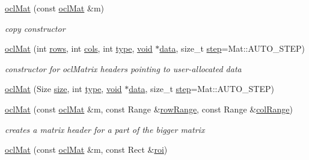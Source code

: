 \begin{DoxyCompactItemize}
\item 
\hyperlink{classcv_1_1ocl_1_1oclMat_a1b06b658bf4bcb8f9a41c969ded8af22}{ocl\-Mat} (const \hyperlink{classcv_1_1ocl_1_1oclMat}{ocl\-Mat} \&m)
\begin{DoxyCompactList}\small\item\em copy constructor \end{DoxyCompactList}\item 
\hyperlink{classcv_1_1ocl_1_1oclMat_a73947d6aaec7670cda8f91edf6c9111a}{ocl\-Mat} (int \hyperlink{classcv_1_1ocl_1_1oclMat_a1ccf0125fff51e419aa89b144ed511be}{rows}, int \hyperlink{classcv_1_1ocl_1_1oclMat_ac814acb1fd2613d43e5fbb9c2166ac9f}{cols}, int \hyperlink{classcv_1_1ocl_1_1oclMat_acf6fe0735d1dac151e2c301f01470827}{type}, \hyperlink{legacy_8hpp_a8bb47f092d473522721002c86c13b94e}{void} $\ast$\hyperlink{classcv_1_1ocl_1_1oclMat_a9eeb429cbc7aca93239988592a40aac5}{data}, size\-\_\-t \hyperlink{classcv_1_1ocl_1_1oclMat_a5449adbd0cfb2cd99a84282d5b4ae8fb}{step}=Mat\-::\-A\-U\-T\-O\-\_\-\-S\-T\-E\-P)
\begin{DoxyCompactList}\small\item\em constructor for ocl\-Matrix headers pointing to user-\/allocated data \end{DoxyCompactList}\item 
\hyperlink{classcv_1_1ocl_1_1oclMat_a81a03473778f2e51d39af5a51113a20c}{ocl\-Mat} (Size \hyperlink{classcv_1_1ocl_1_1oclMat_a21384709f0d43efd26d0c70edc7adf8a}{size}, int \hyperlink{classcv_1_1ocl_1_1oclMat_acf6fe0735d1dac151e2c301f01470827}{type}, \hyperlink{legacy_8hpp_a8bb47f092d473522721002c86c13b94e}{void} $\ast$\hyperlink{classcv_1_1ocl_1_1oclMat_a9eeb429cbc7aca93239988592a40aac5}{data}, size\-\_\-t \hyperlink{classcv_1_1ocl_1_1oclMat_a5449adbd0cfb2cd99a84282d5b4ae8fb}{step}=Mat\-::\-A\-U\-T\-O\-\_\-\-S\-T\-E\-P)
\item 
\hyperlink{classcv_1_1ocl_1_1oclMat_a23929ec8c2874a22b575524e50c073e6}{ocl\-Mat} (const \hyperlink{classcv_1_1ocl_1_1oclMat}{ocl\-Mat} \&m, const Range \&\hyperlink{classcv_1_1ocl_1_1oclMat_a60bd94d8a6110a2e50bf9fbcfc2db0d2}{row\-Range}, const Range \&\hyperlink{classcv_1_1ocl_1_1oclMat_a8d61c3d2a4c840c9f785ea1e319e1981}{col\-Range})
\begin{DoxyCompactList}\small\item\em creates a matrix header for a part of the bigger matrix \end{DoxyCompactList}\item 
\hyperlink{classcv_1_1ocl_1_1oclMat_a6dbad9f24d0d84f6c644a202cdaa97c9}{ocl\-Mat} (const \hyperlink{classcv_1_1ocl_1_1oclMat}{ocl\-Mat} \&m, const Rect \&\hyperlink{legacy_8hpp_a22e52b2b51d064865d3ac2f27b308c33}{roi})

\end{DoxyCompactItemize}
